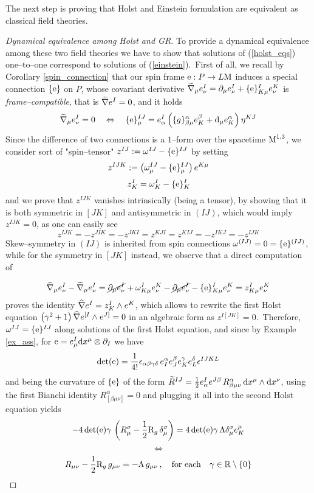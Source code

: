 The next step is proving that Holst and Einstein formulation are equivalent as classical field theories.

\begin{proof}[Dynamical equivalence among Holst and GR]

To provide a dynamical equivalence among these two field theories we have to show that solutions of (\ref{holst_eqs}) one--to--one correspond to solutions of (\ref{einstein}).\, First of all, we recall by Corollary \ref{spin_connection} that our spin frame $\text{\normalfont e}:P\to L\text{\normalfont M}$ induces a special connection $\{\text{\normalfont e}\}$ on $P$, whose covariant derivative $\widetilde{\nabla}_\mu e^I_\nu=\partial_\mu e^I_\nu+\{\text{\normalfont e}\}^I_{K\mu}e^K_\nu$ is \emph{frame--compatible}, that is $\widetilde{\nabla} e^I=0$, and it holds
$$\widetilde{\nabla}_\mu e^I_\nu=0 \quad\Leftrightarrow\quad \{\text{\normalfont e}\}^{IJ}_\mu=e^I_\alpha\left(\{g\}^\alpha_{\beta\mu}e_K^\beta+\text{\normalfont d}_\mu e^\alpha_K\right)\eta^{KJ}$$
Since the difference of two connections is a $1$--form over the spacetime $\text{\normalfont M}^{1,3}$, we consider sort of "spin--tensor" $z^{IJ}:=\omega^{IJ}-\{\text{\normalfont e}\}^{IJ}$ by setting
$$z^{IJK}:=\left(\omega^{IJ}_\mu-\{\text{\normalfont e}\}^{IJ}_\mu\right)e^{K\mu}$$
$$z^I_K=\omega^I_K-\{\text{\normalfont e}\}^I_K$$
 and we prove that $z^{IJK}$ vanishes intrinsically (being a tensor), by showing that it is both symmetric in $[JK]$ and antisymmetric in $(IJ)$, which would imply $z^{IJK}=0$, as one can easily see
$$
z^{IJK}=-z^{JIK}=-z^{JKI}=z^{KJI}=z^{KIJ}=-z^{IKJ}=-z^{IJK}    
$$
Skew--symmetry in $(IJ)$ is inherited from spin connections $\omega^{(IJ)}=0=\{\text{\normalfont e}\}^{(IJ)}$, while for the symmetry in $[JK]$ instead, we observe that a direct computation of 

$$\widehat{\nabla}_\mu e^I_\nu-\widetilde{\nabla}_\mu e^I_\nu=\cancel{\partial_\mu e^I_\nu}+\omega^I_{K\mu}e^K_\nu-\cancel{\partial_\mu e^I_\nu}-\{\text{\normalfont e}\}^I_{K\mu}e^K_\nu=z^I_{K\mu}e^K_\nu$$
proves the identity $\widehat{\nabla} e^I= z^I_K\wedge e^K$, which allows to rewrite the first Holst equation $\left(\gamma^2+1\right)\widehat{\nabla} e^{[I}\wedge e^{J]}=0$ in an algebraic form as $z^{I[JK]}=0$.
\,Therefore, $\omega^{IJ}=\{\text{\normalfont e}\}^{IJ}$ along solutions of the first Holst equation, and since by Example \ref{ex_ass}, for $\text{\normalfont e}=e^I_\mu\text{\normalfont d} x^\mu\otimes\partial_I$ we have
$$\det(\text{\normalfont e})=\frac{1}{4!}\epsilon_{\alpha\beta\gamma\delta}\,e^\alpha_I e^\beta_J e^\gamma_K e^\delta_L \epsilon^{IJKL}$$
and being the curvature of $\{\text{\normalfont e}\}$ of the form $\widetilde{R}^{IJ}=\frac{1}{2}e^I_\alpha e^{J\beta}\,R^\alpha_{\beta\mu\nu}\,\text{\normalfont d} x^\mu\wedge\text{\normalfont d} x^\nu$, using the first Bianchi identity $R^\alpha_{[\beta\mu\nu]}=0$ and
plugging it all into the second Holst equation yields 
$$-4\det(\text{\normalfont e})\gamma\,\left(R_\mu^\sigma-\frac{1}{2}\text{\normalfont R}_g\,\delta^\sigma_\mu\right)=4\det(\text{\normalfont e})\gamma\,\Lambda\delta^\sigma_\mu e^\mu_K$$
$$\Leftrightarrow$$
$$R_{\mu\nu}-\frac{1}{2}\text{\normalfont R}_g\,g_{\mu\nu}=-\Lambda\,g_{\mu\nu}\,,\quad\text{for each}\quad\gamma\in\mathbb{R}\setminus\{0\}$$
\end{proof}

